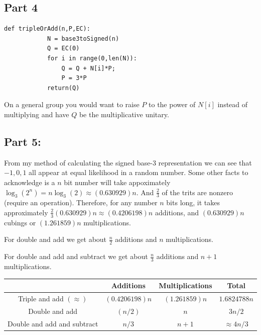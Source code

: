 \documentclass[12pt,letterpaper]{article}
\begin{document}
\subsection*{Part 4}

        \begin{lstlisting}[style = Python]
            def tripleOrAdd(n,P,EC):
            N = base3toSigned(n)
            Q = EC(0)
            for i in range(0,len(N)):
                Q = Q + N[i]*P;
                P = 3*P
            return(Q)
        \end{lstlisting}
    On a general group you would want to raise $P$ to the power of $N[i]$ instead of multiplying and have $Q$ be the multiplicative unitary.
    
\subsection*{Part 5:}

    From my method of calculating the signed base-3 representation we can see that $-1,0,1$ all appear at equal likelihood in a random number. Some other facts to acknowledge is a $n$ bit number will take appoximately $\log_3(2^n)= n\log_3(2) \approx (0.630929)n$. And $\frac{2}{3}$ of the trits are nonzero (require an operation). Therefore, for any number $n$ bits long, it takes approximately $\frac{2}{3}(0.630929)n\approx (0.4206198)n$ additions, and $(0.630929)n$ cubings or $(1.261859)n$ multiplications.
    
    For double and add we get about $\frac{n}{2}$ additions and $n$ multiplications. 
    
    For double and add and subtract we get about $\frac{n}{3}$ additions and $n+1$ multiplications.\\ \cite[pg. 314]{Crypto}
    {\center
    \begin{tabular}{c|c|c|c}
                                    &   Additions       &   Multiplications     &   Total\\ \hline
        Triple and add $(\approx)$  &   $(0.4206198)n$  &   $(1.261859)n$       &   $1.6824788n$\\ 
        Double and add              &   $(n/2)$         &   $n$                 &   $3n/2$\\
        Double and add and subtract &   $n/3$           &   $n+1$               &   $\approx 4n/3$
    \end{tabular}}
    \\
    
\end{document}
